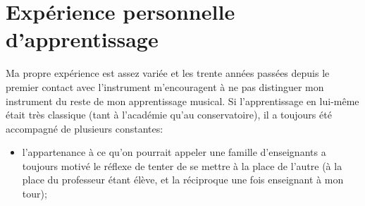 \section*{Expérience personnelle d'apprentissage}
Ma propre expérience est assez variée et les trente années passées depuis le premier contact avec l'instrument m'encouragent à ne pas distinguer mon instrument du reste de mon apprentissage musical. Si l'apprentissage en lui-même était très classique (tant à l'académie qu'au conservatoire), il a toujours été accompagné de plusieurs constantes:

\begin{itemize}
\item l'appartenance à ce qu'on pourrait appeler une famille d'enseignants a toujours motivé le réflexe de tenter de se mettre à la place de l'autre (à la place du professeur étant élève, et la réciproque une fois enseignant à mon tour);


\end{itemize}
